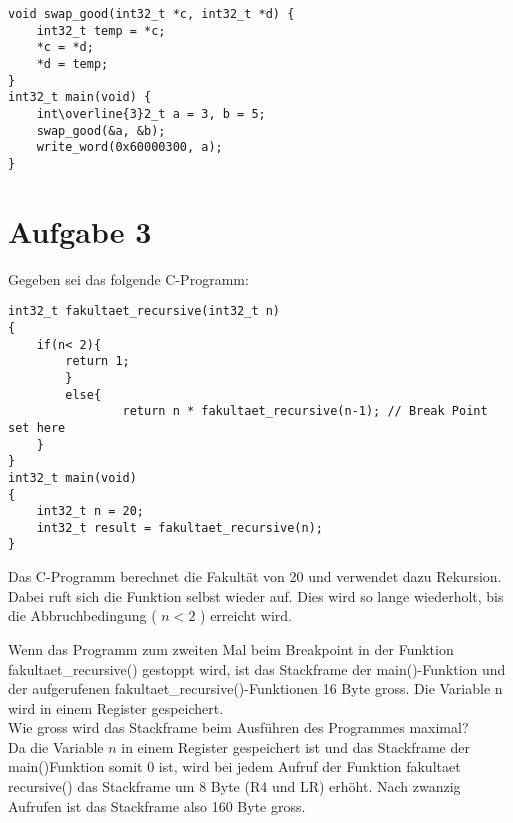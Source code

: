 \begin{verbatim}
void swap_good(int32_t *c, int32_t *d) {
    int32_t temp = *c;
    *c = *d;
    *d = temp;
}
int32_t main(void) {
    int\overline{3}2_t a = 3, b = 5;
    swap_good(&a, &b);
    write_word(0x60000300, a);
}
\end{verbatim}

\section*{Aufgabe 3}
Gegeben sei das folgende C-Programm:

\begin{verbatim}
int32_t fakultaet_recursive(int32_t n)
{
    if(n< 2){
        return 1;
        }
        else{
                return n * fakultaet_recursive(n-1); // Break Point set here
    }
}
int32_t main(void)
{
    int32_t n = 20;
    int32_t result = fakultaet_recursive(n);
}
\end{verbatim}

Das C-Programm berechnet die Fakultät von 20 und verwendet dazu Rekursion. Dabei ruft sich die Funktion selbst wieder auf. Dies wird so lange wiederholt, bis die Abbruchbedingung ( $n<2$ ) erreicht wird.

Wenn das Programm zum zweiten Mal beim Breakpoint in der Funktion fakultaet\_recursive() gestoppt wird, ist das Stackframe der main()-Funktion und der aufgerufenen fakultaet\_recursive()-Funktionen 16 Byte gross. Die Variable n wird in einem Register gespeichert.\\
Wie gross wird das Stackframe beim Ausführen des Programmes maximal?\\
Da die Variable $n$ in einem Register gespeichert ist und das Stackframe der main()Funktion somit 0 ist, wird bei jedem Aufruf der Funktion fakultaet recursive() das Stackframe um 8 Byte (R4 und LR) erhöht. Nach zwanzig Aufrufen ist das Stackframe also 160 Byte gross.
